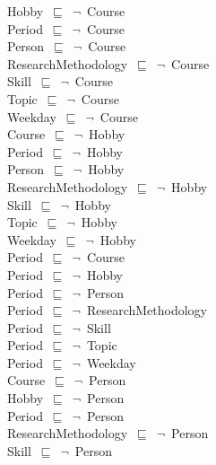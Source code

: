 \documentclass{article}
\begin{document}
Hobby~\ensuremath{\sqsubseteq}~\ensuremath{\lnot}~Course\\
Period~\ensuremath{\sqsubseteq}~\ensuremath{\lnot}~Course\\
Person~\ensuremath{\sqsubseteq}~\ensuremath{\lnot}~Course\\
ResearchMethodology~\ensuremath{\sqsubseteq}~\ensuremath{\lnot}~Course\\
Skill~\ensuremath{\sqsubseteq}~\ensuremath{\lnot}~Course\\
Topic~\ensuremath{\sqsubseteq}~\ensuremath{\lnot}~Course\\
Weekday~\ensuremath{\sqsubseteq}~\ensuremath{\lnot}~Course\\
Course~\ensuremath{\sqsubseteq}~\ensuremath{\lnot}~Hobby\\
Period~\ensuremath{\sqsubseteq}~\ensuremath{\lnot}~Hobby\\
Person~\ensuremath{\sqsubseteq}~\ensuremath{\lnot}~Hobby\\
ResearchMethodology~\ensuremath{\sqsubseteq}~\ensuremath{\lnot}~Hobby\\
Skill~\ensuremath{\sqsubseteq}~\ensuremath{\lnot}~Hobby\\
Topic~\ensuremath{\sqsubseteq}~\ensuremath{\lnot}~Hobby\\
Weekday~\ensuremath{\sqsubseteq}~\ensuremath{\lnot}~Hobby\\
Period~\ensuremath{\sqsubseteq}~\ensuremath{\lnot}~Course\\
Period~\ensuremath{\sqsubseteq}~\ensuremath{\lnot}~Hobby\\
Period~\ensuremath{\sqsubseteq}~\ensuremath{\lnot}~Person\\
Period~\ensuremath{\sqsubseteq}~\ensuremath{\lnot}~ResearchMethodology\\
Period~\ensuremath{\sqsubseteq}~\ensuremath{\lnot}~Skill\\
Period~\ensuremath{\sqsubseteq}~\ensuremath{\lnot}~Topic\\
Period~\ensuremath{\sqsubseteq}~\ensuremath{\lnot}~Weekday\\
Course~\ensuremath{\sqsubseteq}~\ensuremath{\lnot}~Person\\
Hobby~\ensuremath{\sqsubseteq}~\ensuremath{\lnot}~Person\\
Period~\ensuremath{\sqsubseteq}~\ensuremath{\lnot}~Person\\
ResearchMethodology~\ensuremath{\sqsubseteq}~\ensuremath{\lnot}~Person\\
Skill~\ensuremath{\sqsubseteq}~\ensuremath{\lnot}~Person\\
\end{document}
